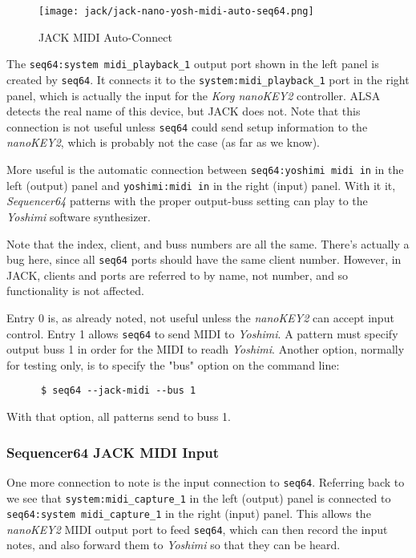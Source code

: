 \begin{figure}[H]
   \centering 
   \texttt{[image: jack/jack-nano-yosh-midi-auto-seq64.png]}
   \caption{JACK MIDI Auto-Connect}
   \label{fig:seq64_jack_nano_yosh_midi_auto}
\end{figure}

   The \texttt{seq64:system midi\_playback\_1} output port shown
   in the left panel is created by \texttt{seq64}.  It connects it to the 
   \texttt{system:midi\_playback\_1} port in the right panel, which
   is actually the input for the \textsl{Korg nanoKEY2} controller.  ALSA
   detects the real name of this device, but JACK does not.  
   Note that this connection is not useful unless \texttt{seq64} could send
   setup information to the \textsl{nanoKEY2}, which is probably not the case
   (as far as we know).

   More useful is the automatic connection between
   \texttt{seq64:yoshimi midi in} in the left (output) panel and
   \texttt{yoshimi:midi in} in the right (input) panel.  With it it,
   \textsl{Sequencer64} patterns with the proper output-buss setting can play
   to the \textsl{Yoshimi} software synthesizer.

   Note that the index, client, and buss numbers are all the same.
   There's actually a bug here, since all \texttt{seq64} ports should have the
   same client number.  However, in JACK, clients and ports are referred to by
   name, not number, and so functionality is not affected.

   Entry 0 is, as already noted, not useful unless the \textsl{nanoKEY2} can
   accept input control.  Entry 1 allows \texttt{seq64} to send MIDI
   to \textsl{Yoshimi}.  A pattern must specify output buss 1 in order for the
   MIDI to readh \textsl{Yoshimi}.  Another option, normally for testing only,
   is to specify the "bus" option on the command line:

   \begin{verbatim}
      $ seq64 --jack-midi --bus 1
   \end{verbatim}

   With that option, all patterns send to buss 1.

\subsubsection{Sequencer64 JACK MIDI Input}
\label{subsubsec:seq64_jack_midi_input}

   One more connection to note is the input connection to \texttt{seq64}.
   Referring back to 
   we see that
   \texttt{system:midi\_capture\_1} in the left (output) panel is connected to
   \texttt{seq64:system midi\_capture\_1} in the right (input) panel.
   This allows the \textsl{nanoKEY2} MIDI output port to feed \texttt{seq64},
   which can then record the input notes, and also forward them to
   \textsl{Yoshimi} so that they can be heard.

